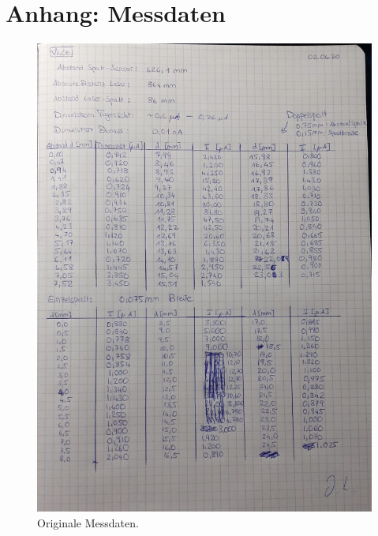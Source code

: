 \newpage
\section*{Anhang: Messdaten}

\begin{figure}
    \centering
    \includegraphics[width=.75\textwidth]{plots/Daten.jpeg}    
    \caption{Originale Messdaten.}
\end{figure}

\pagebreak